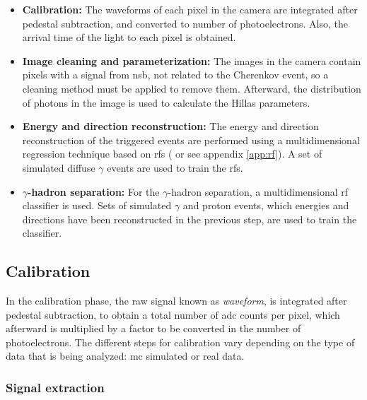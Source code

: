 \documentclass[main.tex]{subfiles}
\begin{document}
\begin{itemize}
\item\textbf{Calibration:} The waveforms of each pixel in the camera are integrated after pedestal subtraction, and converted to number of photoelectrons. Also, the arrival time of the light to each pixel is obtained.
\item\textbf{Image cleaning and parameterization:} The images in the camera contain pixels with a signal from \gls{nsb}, not related to the Cherenkov event, so a cleaning method must be applied to remove them. Afterward, the distribution of photons in the image is used to calculate the Hillas parameters.
\item\textbf{Energy and direction reconstruction:} The energy and direction reconstruction of the triggered events are performed using a multidimensional regression technique based on \glspl{rf} (\cite{breiman2001random} or see appendix \ref{app:rf}). A set of simulated diffuse $\gamma$ events are used to train the \glspl{rf}.
\item\textbf{$\gamma$-hadron separation:} For the $\gamma$-hadron separation, a multidimensional \gls{rf} classifier is used. Sets of simulated $\gamma$ and proton events, which energies and directions have been reconstructed in the previous step, are used to train the classifier.\\
\end{itemize}

\subsection{Calibration} \label{sec:calib}

In the calibration phase, the raw signal known as \textit{waveform}, is integrated after pedestal subtraction, to obtain a total number of \gls{adc} counts per pixel, which afterward is multiplied by a factor to be converted in the number of photoelectrons. The different steps for calibration vary depending on the type of data that is being analyzed: \gls{mc} simulated or real data.

\subsubsection{Signal extraction} \label{sec:signalext}
\end{document}
